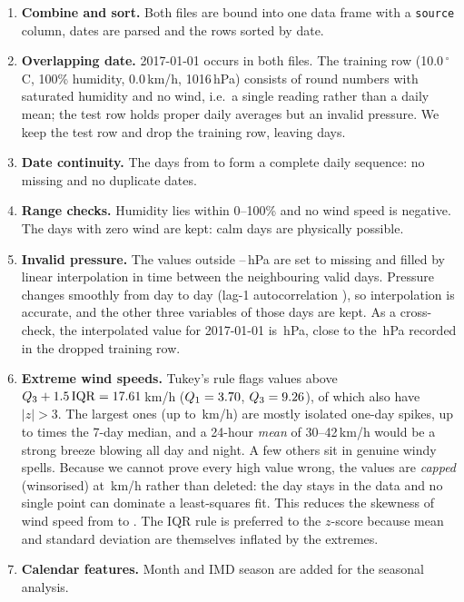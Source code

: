 \documentclass[11pt,a4paper]{article}
\newcommand{\var}[1]{\texttt{#1}}
\begin{document}
\begin{enumerate}
  \item \textbf{Combine and sort.} Both files are bound into one data frame with a
        \var{source} column, dates are parsed and the rows sorted by date.
  \item \textbf{Overlapping date.} 2017-01-01 occurs in both files. The training row
        (10.0\,$^\circ$C, 100\% humidity, 0.0\,km/h, 1016\,hPa) consists of round numbers
        with saturated humidity and no wind, i.e.\ a single reading rather than a daily
        mean; the test row holds proper daily averages but an invalid pressure. We keep
        the test row and drop the training row, leaving \nDays{} days.
  \item \textbf{Date continuity.} The days from \dateStart{} to \dateEnd{} form a complete
        daily sequence: no missing and no duplicate dates.
  \item \textbf{Range checks.} Humidity lies within 0--100\% and no wind speed is negative.
        The \nWindZero{} days with zero wind are kept: calm days are physically possible.
  \item \textbf{Invalid pressure.} The \nPressFixed{} values outside
        \pressMin--\pressMax\,hPa are set to missing and filled by linear interpolation
        in time between the neighbouring valid days. Pressure changes smoothly from day to
        day (lag-1 autocorrelation \acfP), so interpolation is accurate, and the other three
        variables of those days are kept. As a cross-check, the interpolated value for
        2017-01-01 is \overlapInterp\,hPa, close to the \overlapTrainP\,hPa recorded in the
        dropped training row.
  \item \textbf{Extreme wind speeds.} Tukey's rule flags \nWindCapped{} values above
        $Q_3+1.5\,\mathrm{IQR}=17.61$\,km/h ($Q_1=3.70$, $Q_3=9.26$), of which
        \nWindZthree{} also have $|z|>3$. The largest ones (up to \windMaxRaw\,km/h) are
        mostly isolated one-day spikes, up to \spikeRatioMax{} times the 7-day median, and a 24-hour \emph{mean} of
        30--42\,km/h would be a strong breeze blowing all day and night. A few others sit in
        genuine windy spells. Because we cannot prove every high value wrong, the values are
        \emph{capped} (winsorised) at \windCap\,km/h rather than deleted: the day stays in
        the data and no single point can dominate a least-squares fit. This reduces the
        skewness of wind speed from \windSkewRaw{} to \windSkewClean. The IQR rule is
        preferred to the $z$-score because mean and standard deviation are themselves
        inflated by the extremes.
  \item \textbf{Calendar features.} Month and IMD season are added for the seasonal analysis.
\end{enumerate}
\end{document}
